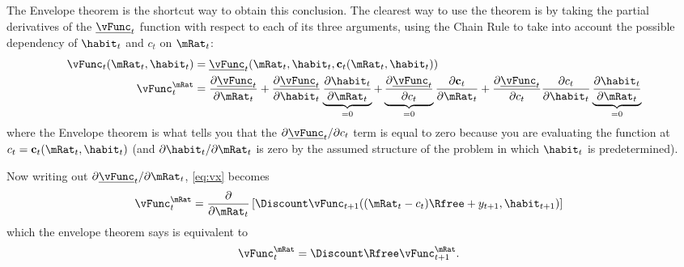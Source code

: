 The Envelope theorem is the shortcut way to obtain this conclusion.  The
clearest way to use the theorem is by taking the partial derivatives
of the $\underline{\vFunc}_{t}$ function with respect to each of its three arguments,
using the Chain Rule to take into account the possible dependency of
$\habit_{t}$ and $c_{t}$ on $\mRat_{t}$:
\begin{equation}\begin{gathered}\begin{aligned}
        \vFunc_{t}(\mRat_{t},\habit_{t}) & =  \underline{\vFunc}_{t}(\mRat_{t},\habit_{t},\mathbf{c}_{t}(\mRat_{t},\habit_{t}))  \\
        \vFunc_{t}^{\mRat} & =  \frac{\partial \underline{\vFunc}_{t}}{\partial \mRat_{t}}
        + \frac{\partial \underline{\vFunc}_{t}}{\partial \habit_{t}}\underbrace{\frac{\partial \habit_{t}}{\partial \mRat_{t}}}_{=0}
        + \underbrace{\frac{\partial \underline{\vFunc}_{t}}{\partial c_{t}}}_{=0}\frac{\partial \mathbf{c}_{t}}{\partial \mRat_{t}}+\frac{\partial \underline{\vFunc}_{t}}{\partial c_{t}}\frac{\partial c_{t}}{\partial \habit_{t}}\underbrace{\frac{\partial \habit_{t}}{\partial \mRat_{t}}}_{=0} \label{eq:vx}
\end{aligned}\end{gathered}\end{equation}
where the Envelope theorem is what tells you that the $\partial
\underline{\vFunc}_{t}/\partial c_{t}$ term is equal to zero because you are
evaluating the function at $c_{t}=\mathbf{c}_{t}(\mRat_{t},\habit_{t})$ (and
$\partial \habit_{t}/\partial \mRat_{t}$ is zero by the assumed structure of
the problem in which $\habit_{t}$ is predetermined).

Now writing out $\partial \underline{\vFunc}_{t}/\partial \mRat_{t}$, \eqref{eq:vx}
becomes
\begin{equation}\begin{gathered}\begin{aligned}
\vFunc^{\mRat}_{t} & =  \frac{\partial}{\partial \mRat_{t}}\left[\Discount \vFunc_{t+1}((\mRat_{t}-c_{t})\Rfree+y_{t+1},\habit_{t+1})\right]
                  \label{eq:partialx}
\end{aligned}\end{gathered}\end{equation}
which the envelope theorem says is equivalent to
\begin{equation}\begin{gathered}\begin{aligned}
\vFunc^{\mRat}_{t} & =  \Discount  \Rfree \vFunc_{t+1}^{\mRat}. \label{eq:envelopex}
\end{aligned}\end{gathered}\end{equation}

